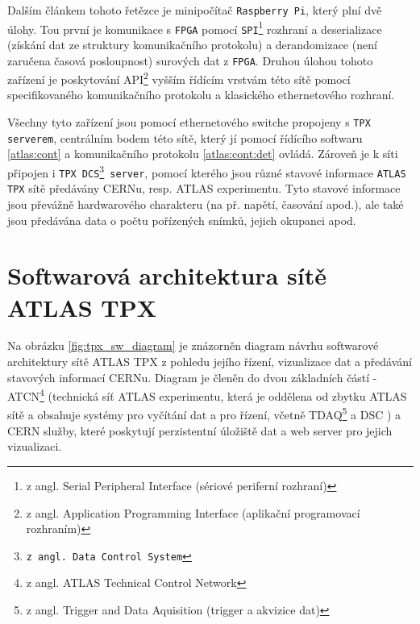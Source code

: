 Dalším článkem tohoto řetězce je minipočítač \texttt{Raspberry Pi}, který plní dvě úlohy. Tou první je komunikace s \texttt{FPGA} pomocí \texttt{SPI}\footnote{z angl. Serial Peripheral Interface (sériové periferní rozhraní)} rozhraní a deserializace (získání dat ze struktury komunikačního protokolu) a derandomizace (není zaručena časová posloupnost) surových dat z \texttt{FPGA}. Druhou úlohou tohoto zařízení je poskytování API\footnote{z angl. Application Programming Interface (aplikační programovací rozhraním)} vyšším řídícím vrstvám této sítě pomocí specifikovaného komunikačního protokolu a klasického ethernetového rozhraní.

Všechny tyto zařízení jsou pomocí ethernetového switche propojeny s \texttt{TPX serverem}, centrálním bodem této sítě, který jí pomocí řídícího softwaru \ref{atlas:cont} a komunikačního protokolu \ref{atlas:cont:det} ovládá. Zároveň je k síti připojen i \texttt{TPX DCS\footnote{z angl. Data Control System} server}, pomocí kterého jsou různé stavové informace \texttt{ATLAS TPX} sítě předávány CERNu, resp. ATLAS experimentu. Tyto stavové informace jsou převážně hardwarového charakteru (na př. napětí, časování apod.), ale také jsou předávána data o počtu pořízených snímků, jejich okupanci apod.

\section{Softwarová architektura sítě ATLAS TPX}\label{atlas:sw_arch}
Na obrázku \ref{fig:tpx_sw_diagram} je znázorněn diagram návrhu softwarové architektury sítě ATLAS TPX z pohledu jejího řízení, vizualizace dat a předávání stavových informací CERNu. Diagram je členěn do dvou základních částí - ATCN\footnote{z angl. ATLAS Technical Control Network} (technická síť ATLAS experimentu, která je oddělena od zbytku ATLAS sítě a obsahuje systémy pro vyčítání dat a pro řízení, včetně TDAQ\footnote{z angl. Trigger and Data Aquisition (trigger a akvizice dat)} a DSC \cite{Ballestrero:atlas_network_upgrade}) a CERN služby, které poskytují perzistentní úložiště dat a web server pro jejich vizualizaci.

